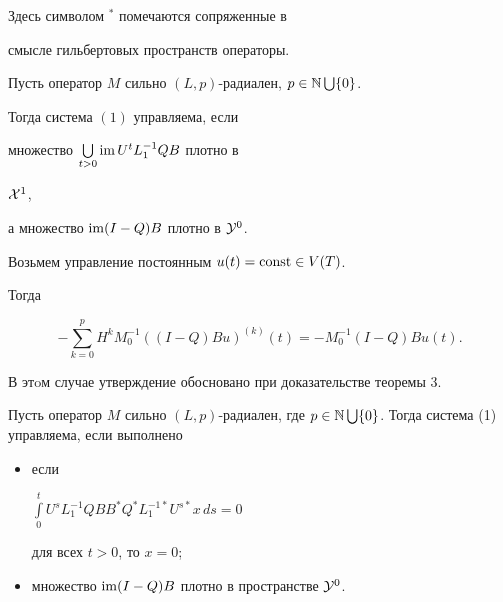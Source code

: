 Здесь символом ${}^*$ помечаются сопряженные в


смысле гильбертовых пространств операторы.





\begin{thm}


Пусть оператор $M$ сильно $(L,p)$-радиален, $p\in{\Bbb N} \bigcup \{0\}$.


Тогда система $(1)$ управляема, если


множество $\bigcup\limits_{t>0} \operatorname{im} U^tL_1^{-1}QB$ плотно в


${\cal X}^1$,


а множество $\operatorname{im}(I-Q)B$ плотно в ${\cal Y}^0$.


\end{thm}





\begin{pf}


Возьмем управление постоянным $u(t)=\operatorname{const} \in V(T)$.


Тогда


$$


-\sum\limits_{k=0}^pH^kM_0^{-1}((I-Q)Bu)^{(k)}(t)=-M^{-1}_0(I-Q)Bu(t).


$$


В этoм случае утверждение обосновано при доказательстве теоремы 3.


\end{pf}





\begin{cor}


Пусть оператор $M$ сильно $(L,p)$-радиален, где $p\in {\Bbb N}


\bigcup \{0\}$. Тогда система (1) управляема, если выполнено


\begin{itemize}


\item[(i)] если


$\int\limits_0^t U^s L_1^{-1}Q B B^{*}Q^{*}L_1^{-1*}U^{s*}x\,ds=0$


для всех $t>0$, то $x=0$;


\item[(ii)] множество $\operatorname{im}(I-Q)B$ плотно в пространстве ${\cal Y}^0$.


\end{itemize}


\end{cor}





